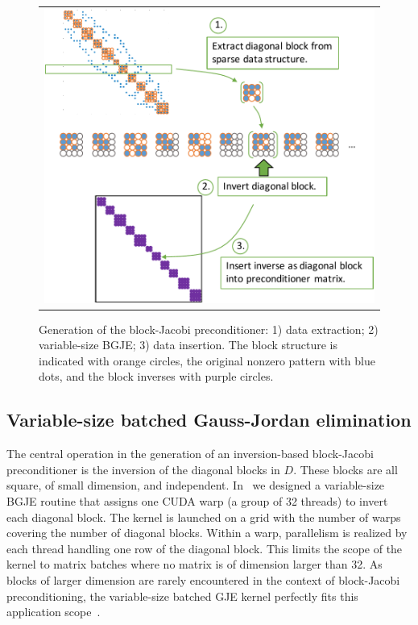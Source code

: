 \begin{figure}
\begin{center}
\begin{tabular}{c}
\includegraphics[width=.65\columnwidth]{plots/scheme_inversion}
\end{tabular}
\end{center}
\caption{Generation of the block-Jacobi preconditioner: 1) data extraction; 2) variable-size BGJE; 3) data insertion.
The block structure is indicated with orange circles, the original nonzero pattern with blue dots, 
    {and} the block inverses with purple circles.
}
\label{2017-gje-block-jacobi:fig:batchedgje}
\end{figure}

\subsection{Variable-size batched Gauss-Jordan elimination}
\label{2017-gje-block-jacobi:subsec:s3-inversion}

The central operation in the generation of an 
inversion-based block-Jacobi preconditioner
is the inversion of the diagonal blocks in $D$.
These blocks are all square, of small dimension, and independent.
In~\cite{Anzt:2017:BGE:3026937.3026940}
we designed a variable-size BGJE routine
that assigns one CUDA warp (a group of 32 threads) 
to invert each diagonal block.
The kernel is launched on a grid with the number of warps 
covering the number of diagonal blocks.
Within a warp, parallelism is realized by each thread handling one row
of the diagonal block.
This limits the scope of the kernel to matrix batches where no matrix
is of dimension larger than 32.
As blocks of larger dimension are rarely {encountered} in the context
of block-Jacobi preconditioning, the variable-size batched GJE
kernel perfectly fits this application scope~\cite{Anzt:2017:BGE:3026937.3026940}.


